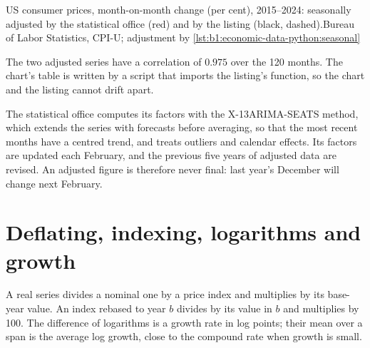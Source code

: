 \begin{omchart}{US consumer prices, month-on-month change (per cent),
2015--2024: seasonally adjusted by the statistical office (red) and by the
listing (black, dashed).}{Bureau of Labor Statistics, CPI-U; adjustment by
\cref{lst:b1:economic-data-python:seasonal}}
\end{omchart}

The two adjusted series have a correlation of $0.975$ over the 120 months.
The chart's table is written by a script that imports the listing's
function, so the chart and the listing cannot drift apart.

\begin{measure}
The statistical office computes its factors with the X-13ARIMA-SEATS
method, which extends the series with forecasts before averaging, so that
the most recent months have a centred trend, and treats outliers and
calendar effects. Its factors are updated each February, and the
previous five years of adjusted data are revised. %
An adjusted figure is therefore never final: last year's December will
change next February.
\end{measure}

\section{Deflating, indexing, logarithms and growth}\label{sec:b1:economic-data-python:deflating}

A real series divides a nominal one by a price index and multiplies by its
base-year value. An index rebased to year $b$ divides by its value in $b$ and
multiplies by 100. The difference of logarithms is a growth rate in log
points; their mean over a span is the average log growth, close to the
compound rate when growth is small.

\label{lst:b1:economic-data-python:deflate}

